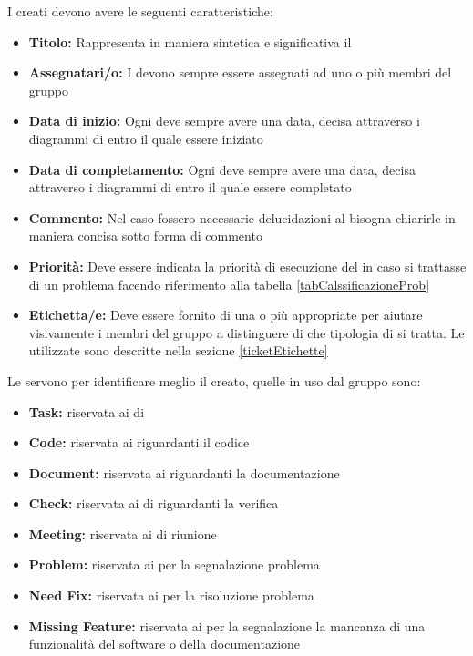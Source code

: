 \documentclass[12pt,a4paper]{article}
\begin{document}
\label{ticketStruttura}
I  creati devono avere le seguenti caratteristiche:
\begin{itemize}
	\item \textbf{Titolo:} Rappresenta in maniera sintetica e significativa il 
	\item \textbf{Assegnatari/o:} I  devono sempre essere assegnati ad uno o più membri del gruppo
	\item \textbf{Data di inizio:} Ogni  deve sempre avere una data, decisa attraverso i diagrammi di  entro il quale essere iniziato
	\item \textbf{Data di completamento:} Ogni  deve sempre avere una data, decisa attraverso i diagrammi di  entro il quale essere completato
	\item \textbf{Commento:} Nel caso fossero necessarie delucidazioni al  bisogna chiarirle in maniera concisa sotto forma di commento
	\item \textbf{Priorità:} Deve essere indicata la priorità di esecuzione del  in caso si trattasse di un problema facendo riferimento alla tabella \ref{tabCalssificazioneProb}
	\item \textbf{Etichetta/e:} Deve essere fornito di una o più appropriate  per aiutare visivamente i membri del gruppo a distinguere di che tipologia di  si tratta. Le  utilizzate sono descritte nella sezione \ref{ticketEtichette}
\end{itemize}

\label{ticketEtichette}
Le  servono per identificare meglio il  creato, quelle in uso dal gruppo sono:
\begin{itemize}
	\item \textbf{Task:} riservata ai  di 
	\item \textbf{Code:} riservata ai  riguardanti il codice
	\item \textbf{Document:} riservata ai  riguardanti la documentazione
	\item \textbf{Check:} riservata ai  di riguardanti la verifica
	\item \textbf{Meeting:} riservata ai  di riunione
	\item \textbf{Problem:} riservata ai  per la segnalazione problema
	\item \textbf{Need Fix:} riservata ai  per la risoluzione problema
	\item \textbf{Missing Feature:} riservata ai  per la segnalazione la mancanza di una funzionalità del software o della documentazione
\end{itemize}
\end{document}
